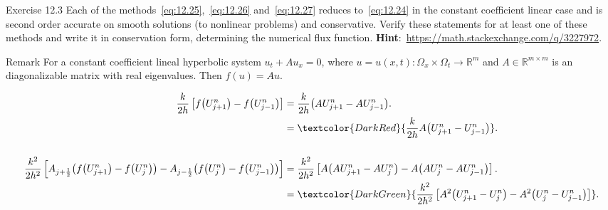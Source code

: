 

\begin{frame}
  \frametitle{\secname}

  \begin{alertblock}{Exercise 12.3}
    Each of the methods~\eqref{eq:12.25},~\eqref{eq:12.26}
    and~\eqref{eq:12.27} reduces to~\eqref{eq:12.24} in the constant
    coefficient linear case and is second order accurate on smooth
    solutions (to nonlinear problems) and conservative.
    Verify these statements for at least one of these methods and
    write it in conservation form, determining the numerical flux
    function.
    \textbf{Hint}:~\url{https://math.stackexchange.com/q/3227972}.
  \end{alertblock}

  \begin{exampleblock}{Remark}
    For a constant coefficient lineal hyperbolic system
    \begin{math}
      u_{t}+
      Au_{x}=
      0
    \end{math},
    where
    \begin{math}
      u=
      u\left(x,t\right)\colon
      \Omega_{x}\times\Omega_{t}\to\mathbb{R}^{m}
    \end{math}
    and $A\in\mathbb{R}^{m\times m}$ is an diagonalizable matrix with
    real eigenvalues.
    Then
    \begin{math}
      f
      \left(u\right)=
      Au
    \end{math}.
  \end{exampleblock}

  \begin{proofs}
    \begin{align*}
      \frac{k}{2h}
      \left[
        f
        \big(U^{n}_{j+1}\big)-
        f
        \big(U^{n}_{j-1}\big)
      \right] & =
      \frac{k}{2h}
      \big(
      AU^{n}_{j+1}-
      AU^{n}_{j-1}
      \big).      \\
              & =
      \textcolor{DarkRed}{
        \frac{k}{2h}
        A
        \big(
        U^{n}_{j+1}-
        U^{n}_{j-1}
      \big)}.     \\[\baselineskip]
      \frac{k^{2}}{2h^{2}}
      \left[
        A_{j+\frac{1}{2}}
        \big(
        f
        \big(U^{n}_{j+1}\big)-
        f
        \big(U^{n}_{j}\big)
        \big)-
        A_{j-\frac{1}{2}}
        \big(
        f
        \big(U^{n}_{j}\big)-
        f
        \big(U^{n}_{j-1}\big)
        \big)
      \right] & =
      \frac{k^{2}}{2h^{2}}
      \left[
        A
        \big(
        AU^{n}_{j+1}-
        AU^{n}_{j}
        \big)-
        A\big(
        AU^{n}_{j}-
        AU^{n}_{j-1}
        \big)
      \right].    \\
              & =
      \textcolor{DarkGreen}{
        \frac{k^{2}}{2h^{2}}
        \left[
          A^{2}
          \big(
          U^{n}_{j+1}-
          U^{n}_{j}
          \big)-
          A^{2}
          \big(
          U^{n}_{j}-
          U^{n}_{j-1}
          \big)
          \right]
      }.
    \end{align*}
  \end{proofs}
\end{frame}

